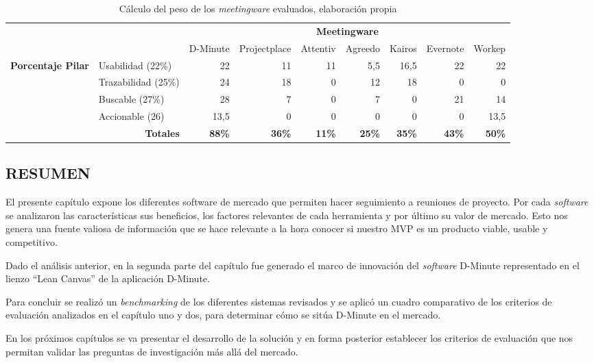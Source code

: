 \begin{table}[!h]
\centering
\caption{Cálculo del peso de los \textit{meetingware} evaluados, elaboración propia}
\label{tab:evaluacionfinal}
\resizebox{15cm}{!} {
\begin{tabular}{cl|r|r|r|r|r|r|r|}
\cline{3-9}
\multicolumn{1}{l}{} &  & \multicolumn{7}{c|}{\textbf{Meetingware}} \\ \cline{3-9} 
\multicolumn{1}{l}{} & \multicolumn{1}{c|}{} & \multicolumn{1}{c|}{D-Minute} & \multicolumn{1}{c|}{Projectplace} & \multicolumn{1}{c|}{Attentiv} & \multicolumn{1}{c|}{Agreedo} & \multicolumn{1}{c|}{Kairos} & \multicolumn{1}{c|}{Evernote} & \multicolumn{1}{c|}{Workep} \\ \hline
\multicolumn{1}{|c|}{\multirow{4}{*}{\textbf{Porcentaje Pilar}}} & Usabilidad (22\%) & 22 & 11 & 11 & 5,5 & 16,5 & 22 & 22 \\ \cline{2-9} 
\multicolumn{1}{|c|}{} & Trazabilidad (25\%) & 24 & 18 & 0 & 12 & 18 & 0 & 0 \\ \cline{2-9} 
\multicolumn{1}{|c|}{} & Buscable (27\%) & 28 & 7 & 0 & 7 & 0 & 21 & 14 \\ \cline{2-9} 
\multicolumn{1}{|c|}{} & Accionable (26) & 13,5 & 0 & 0 & 0 & 0 & 0 & 13,5 \\ \hline
\multicolumn{2}{|r|}{\textbf{Totales}} & \textbf{88\%} & \textbf{36\%} & \textbf{11\%} & \textbf{25\%} & \textbf{35\%} & \textbf{43\%} & \textbf{50\%} \\ \hline
\end{tabular}

}
\end{table}


\subsection{RESUMEN}

El presente capítulo expone los diferentes software de mercado que permiten hacer seguimiento a reuniones de proyecto. Por cada \textit{software} se analizaron las características sus beneficios, los factores relevantes de cada herramienta y por último su valor de mercado. Esto nos genera una fuente valiosa de información que se hace relevante a la hora conocer si nuestro MVP es un producto viable, usable y competitivo. 

Dado el análisis anterior, en la segunda parte del capítulo fue generado el marco de innovación del \textit{software} D-Minute representado en el lienzo “Lean Canvas” de la aplicación D-Minute.

Para concluir se realizó un \textit{benchmarking} de los diferentes sistemas revisados y se aplicó un cuadro comparativo de los criterios de evaluación analizados en el capítulo uno y dos, para determinar cómo se sitúa D-Minute en el mercado.

En los próximos capítulos se va presentar el desarrollo de la solución y en forma posterior establecer los criterios de evaluación que nos permitan validar las preguntas de investigación más allá del mercado.


